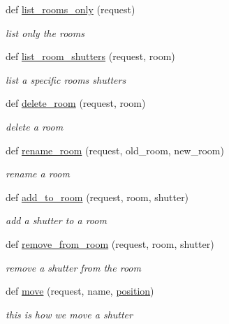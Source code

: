 \begin{DoxyCompactItemize}
def \hyperlink{namespacecontroller_1_1views_a60eebf620def5afc7e35004a4f34b073}{list\+\_\+rooms\+\_\+only} (request)
\begin{DoxyCompactList}\small\item\em list only the rooms \end{DoxyCompactList}\item 
def \hyperlink{namespacecontroller_1_1views_a552bb38779c88d2fd98d5116a7ee952e}{list\+\_\+room\+\_\+shutters} (request, room)
\begin{DoxyCompactList}\small\item\em list a specific room\textquotesingle{}s shutters \end{DoxyCompactList}\item 
def \hyperlink{namespacecontroller_1_1views_a82f0cdbd29a35096496d79b7915ac89e}{delete\+\_\+room} (request, room)
\begin{DoxyCompactList}\small\item\em delete a room \end{DoxyCompactList}\item 
def \hyperlink{namespacecontroller_1_1views_a1b7d046b2086952f35b54e84fbce9b05}{rename\+\_\+room} (request, old\+\_\+room, new\+\_\+room)
\begin{DoxyCompactList}\small\item\em rename a room \end{DoxyCompactList}\item 
def \hyperlink{namespacecontroller_1_1views_a4e7163f7f3a8bb5c7600ffd72e0fa6d1}{add\+\_\+to\+\_\+room} (request, room, shutter)
\begin{DoxyCompactList}\small\item\em add a shutter to a room \end{DoxyCompactList}\item 
def \hyperlink{namespacecontroller_1_1views_a10f36bbe2d1b2e394124a6ea11d3c014}{remove\+\_\+from\+\_\+room} (request, room, shutter)
\begin{DoxyCompactList}\small\item\em remove a shutter from the room \end{DoxyCompactList}\item 
def \hyperlink{namespacecontroller_1_1views_a155af175864fbdf91a8f42e7c7683790}{move} (request, name, \hyperlink{namespacecontroller_1_1views_af4a1b79435d815cad6aa25c3c45aa080}{position})
\begin{DoxyCompactList}\small\item\em this is how we move a shutter \end{DoxyCompactList}\item 

\end{DoxyCompactItemize}
